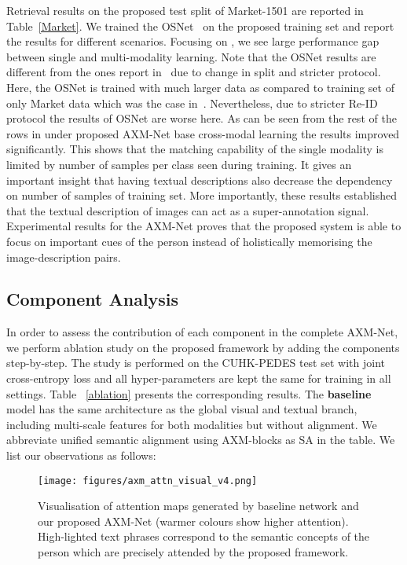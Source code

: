 \documentclass[10pt,twocolumn,letterpaper]{article}
\begin{document}
Retrieval results on the proposed test split of Market-1501 are reported in Table~\ref{Market}. We trained the OSNet~\cite{zhou2019omni} on the proposed training set and report the results for different scenarios. Focusing on , we see large performance gap between single and multi-modality learning. Note that the OSNet results are different from the ones report in~\cite{zhou2019omni} due to change in split and stricter protocol. Here, the OSNet is trained with much larger data as compared to training set of only Market data which was the case in~\cite{zhou2019omni}. Nevertheless, due to stricter Re-ID protocol the results of OSNet are worse here. As can be seen from the rest of the rows in  under proposed AXM-Net base cross-modal learning the results improved significantly. 
This shows that the matching capability of the single modality is limited by number of samples per class seen during training. It gives an important insight that having textual descriptions also decrease the dependency on number of samples of training set. More importantly, these results established that the textual description of images can act as a super-annotation signal. Experimental results for the AXM-Net proves that the proposed system is able to focus on important cues of the person instead of holistically memorising the image-description pairs. 
\subsection{Component Analysis}
In order to assess the contribution of each component in the complete AXM-Net, we perform ablation study on the proposed framework by adding the components step-by-step. The study is performed on the CUHK-PEDES test set with joint cross-entropy loss  and all hyper-parameters are kept the same for training in all settings. Table ~\ref{ablation} presents the corresponding results. The \textbf{baseline} model has the same architecture as the global visual and textual branch, including multi-scale features for both modalities but without alignment. We abbreviate unified semantic alignment using AXM-blocks as SA in the table. We list our observations as follows:

\begin{figure*}[!htbp]
\centering
        \texttt{[image: figures/axm\_attn\_visual\_v4.png]}
        \caption{Visualisation of attention maps generated by baseline network and our proposed AXM-Net (warmer colours show higher attention). High-lighted text phrases correspond to the semantic concepts of the person which are precisely attended by the proposed framework.}
    \label{attn_visual}
\end{figure*}
\end{document}
